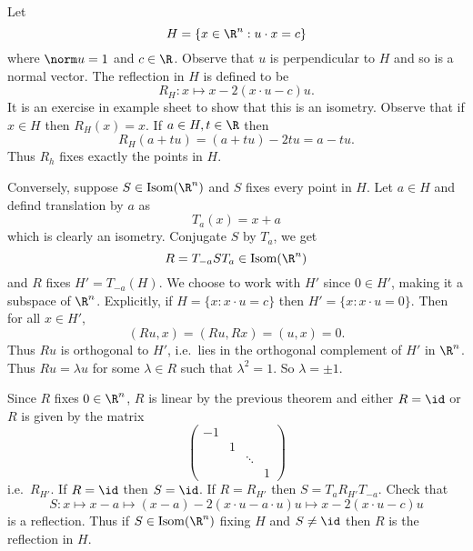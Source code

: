 \documentclass[a4paper]{article}
\DeclareMathOperator{\Isom}{Isom}
\begin{document}
\begin{eg}
  Let
  \[
    H = \{x \in \R^n: u \cdot x = c\}
  \]
  where \(\norm u = 1\) and \(c \in \R\). Observe that \(u\) is perpendicular to \(H\) and so is a normal vector. The reflection in \(H\) is defined to be
  \[
    R_H: x \mapsto x - 2(x \cdot u - c)u.
  \]
  It is an exercise in example sheet to show that this is an isometry. Observe that if \(x \in H\) then \(R_H(x) = x\). If \(a \in H, t \in \R\) then
  \[
    R_H(a + tu) = (a + tu) - 2tu = a - tu.
  \]
  Thus \(R_h\) fixes exactly the points in \(H\).

  Conversely, suppose \(S \in \Isom(\R^n)\) and \(S\) fixes every point in \(H\). Let \(a \in H\) and defind translation by \(a\) as
  \[
    T_a(x) = x + a
  \]
  which is clearly an isometry. Conjugate \(S\) by \(T_a\), we get
  \[
    R = T_{-a}ST_a \in \Isom(\R^n)
  \]
  and \(R\) fixes \(H' = T_{-a}(H)\). We choose to work with \(H'\) since \(0 \in H'\), making it a subspace of \(\R^n\). Explicitly, if \(H = \{x: x\cdot u = c\}\) then \(H' = \{x: x \cdot u = 0\}\). Then for all \(x \in H'\),
  \[
    (Ru, x) = (Ru, Rx) = (u, x) = 0.
  \]
  Thus \(Ru\) is orthogonal to \(H'\), i.e.\ lies in the orthogonal complement of \(H'\) in \(\R^n\). Thus \(Ru = \lambda u\) for some \(\lambda \in R\) such that \(\lambda^2 = 1\). So \(\lambda = \pm 1\).

  Since \(R\) fixes \(0 \in \R^n\), \(R\) is linear by the previous theorem and either \(R = \id\) or \(R\) is given by the matrix
  \[
    \begin{pmatrix}
      -1 & & \\
      & 1 & \\
      & & \ddots \\
      & & & 1
    \end{pmatrix}
  \]
  i.e.\ \(R_{H'}\). If \(R = \id\) then \(S = \id\). If \(R = R_{H'}\) then \(S = T_aR_{H'}T_{-a}\). Check that
  \[
    S: x \mapsto x - a \mapsto (x - a) - 2(x \cdot u - a \cdot u) u \mapsto x - 2(x \cdot u - c)u
  \]
  is a reflection. Thus if \(S \in \Isom(\R^n)\) fixing \(H\) and \(S \neq \id \) then \(R\) is the reflection in \(H\).
\end{eg}



\printindex

\iffalse
Other courses that might be useful: topology, part of analysis II (differentiability in R^n and inverse function theorem)

Leads to: IID Differential Geometry

Reading List

P.\ Wilson, Curverd Spaces, CUP 2008
From classical geometries to elementary differential geometry
\fi
\end{document}

